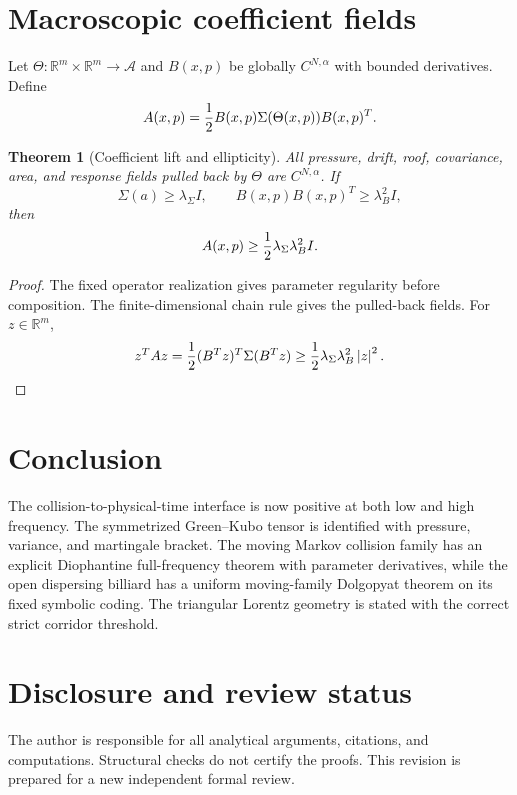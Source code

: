 \documentclass[11pt,reqno]{amsart}
\newtheorem{theorem}{Theorem}[section]
\theoremstyle{definition}
\theoremstyle{remark}
\newcommand{\A}{\mathcal A}
\newcommand{\R}{\mathbb R}
\newcommand{\abs}[1]{\left\lvert #1\right\rvert}
\begin{document}
\section{Macroscopic coefficient fields}

Let $\Theta:\R^m\times\R^m\to\A$ and $B(x,p)$ be globally
$C^{N,\alpha}$ with bounded derivatives.  Define
\[
 A(x,p)={1\over2}B(x,p)\Sigma(\Theta(x,p))B(x,p)^T.
\]

\begin{theorem}[Coefficient lift and ellipticity]\label{thm:lift}
All pressure, drift, roof, covariance, area, and response fields pulled back by
$\Theta$ are $C^{N,\alpha}$.  If
\[
 \Sigma(a)\ge\lambda_\Sigma I,
 \qquad B(x,p)B(x,p)^T\ge\lambda_B^2I,
\]
then
\[
 A(x,p)\ge{1\over2}\lambda_\Sigma\lambda_B^2I.
\]
\end{theorem}

\begin{proof}
The fixed operator realization gives parameter regularity before composition.
The finite-dimensional chain rule gives the pulled-back fields.  For $z\in
\R^m$,
\[
 z^TAz={1\over2}(B^Tz)^T\Sigma(B^Tz)
 \ge{1\over2}\lambda_\Sigma\lambda_B^2\abs z^2.
\]
\end{proof}

\section{Conclusion}

The collision-to-physical-time interface is now positive at both low and high
frequency.  The symmetrized Green--Kubo tensor is identified with pressure,
variance, and martingale bracket.  The moving Markov collision family has an
explicit Diophantine full-frequency theorem with parameter derivatives, while
the open dispersing billiard has a uniform moving-family Dolgopyat theorem on
its fixed symbolic coding.  The triangular Lorentz geometry is stated with the
correct strict corridor threshold.

\section*{Disclosure and review status}
The author is responsible for all analytical arguments, citations, and
computations.  Structural checks do not certify the proofs.  This revision is
prepared for a new independent formal review.



\end{document}
